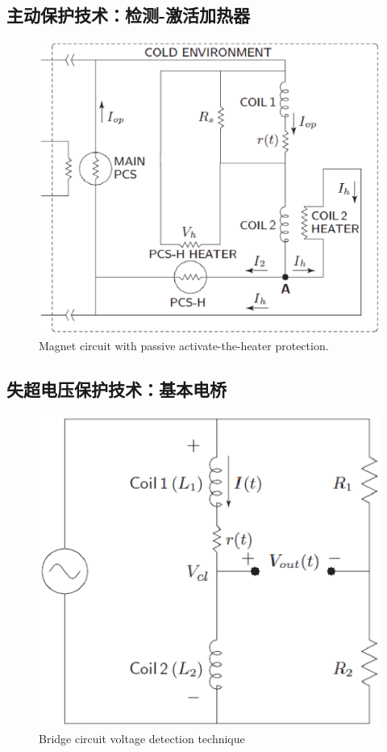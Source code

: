 \subsection{主动保护技术：检测-激活加热器}

\begin{figure}
	\centering
	\includegraphics[scale=0.6]{chpt8/figs/fig8.18.eps}
	\caption{Magnet circuit with passive activate-the-heater protection.}
\end{figure}




\subsection{失超电压保护技术：基本电桥}


\begin{figure}
	\centering
	\includegraphics[scale=0.6]{chpt8/figs/fig8.19.eps}
	\caption{Bridge circuit voltage detection technique}
\end{figure}


